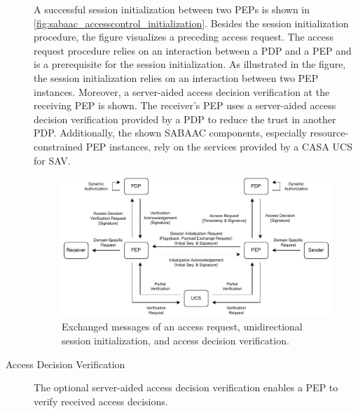 \begin{description}
    A successful session initialization between two PEPs is shown in \autoref{fig:sabaac_accesscontrol_initialization}.
    Besides the session initialization procedure, the figure visualizes a preceding access request.
    The access request procedure relies on an interaction between a PDP and a PEP and is a prerequisite for the session initialization.
    As illustrated in the figure, the session initialization relies on an interaction between two PEP instances.
    Moreover, a server-aided access decision verification at the receiving PEP is shown.
    The receiver's PEP uses a server-aided access decision verification provided by a PDP to reduce the trust in another PDP.
    Additionally, the shown SABAAC components, especially resource-constrained PEP instances, rely on the services provided by a CASA UCS for SAV.
    \begin{figure}
        \centering
        \includegraphics[width=1.0\linewidth]{figures/SABAAC_protocols_accesscontrol_initialization.drawio.pdf}
        \caption{Exchanged messages of an access request, unidirectional session initialization, and access decision verification.
        }
        \label{fig:sabaac_accesscontrol_initialization}
    \end{figure}
    \item[Access Decision Verification] The optional server-aided access decision verification enables a PEP to verify received access decisions.

\end{description}
